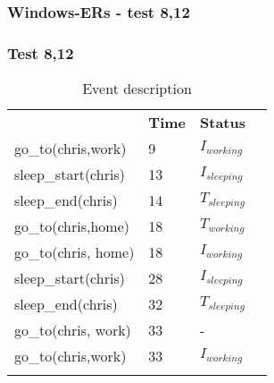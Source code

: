 \documentclass[8pt]{beamer}
\begin{document}
\begin{frame}
    \frametitle{Windows-ERs - test 8,12}
    \subsubsection{Test 8,12}
    \small
    \begin{minipage}{0.48\linewidth}
        \begin{table}[t!]
            \caption{Event description}
            \begin{center}

                \begin{tabular}{llll}
                    \hline\noalign{\smallskip}
                    \multicolumn{1}{l}{\textbf{Event}} & \multicolumn{1}{c}{\textbf{Time}} & \multicolumn{1}{c}{\textbf{Status}}  \\
                    go\_to(chris,work)& 9 & $I_{working}$\\
                    sleep\_start(chris)& 13 &$I_{sleeping}$\\
                    sleep\_end(chris)& 14 &$T_{sleeping}$\\
                    go\_to(chris,home)& 18 &$T_{working}$\\
                    go\_to(chris, home)& 18 &$I_{working}$\\
                    sleep\_start(chris)& 28 &$I_{sleeping}$\\
                    sleep\_end(chris)& 32& $T_{sleeping}$\\
                    go\_to(chris, work)& 33& -\\
                    go\_to(chris,work)& 33&$I_{working}$\\
                    \noalign{\smallskip}
                    \hline
                \end{tabular}
            \end{center}
        \end{table}


    \end{minipage}
    \begin{minipage}{0.48\linewidth}


\end{minipage}
\end{frame}
\end{document}
